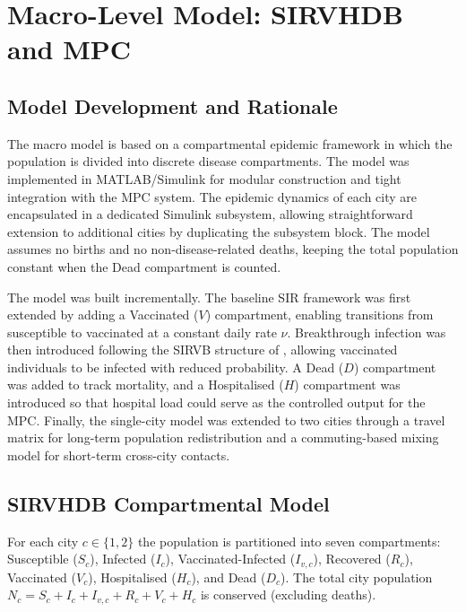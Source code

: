 

\chapter{Macro-Level Model: SIRVHDB and MPC}
\label{ch:macro_model}

\section{Model Development and Rationale}
\label{sec:model_dev}

The macro model is based on a compartmental epidemic framework in which the population is divided into discrete disease compartments.
The model was implemented in MATLAB/Simulink for modular construction and tight integration with the MPC system.
The epidemic dynamics of each city are encapsulated in a dedicated Simulink subsystem, allowing straightforward extension to additional cities by duplicating the subsystem block.
The model assumes no births and no non-disease-related deaths, keeping the total population constant when the Dead compartment is counted.

The model was built incrementally.
The baseline SIR framework was first extended by adding a Vaccinated ($V$) compartment, enabling transitions from susceptible to vaccinated at a constant daily rate $\nu$.
Breakthrough infection was then introduced following the SIRVB structure of \citet{ariyaratne2025}, allowing vaccinated individuals to be infected with reduced probability.
A Dead ($D$) compartment was added to track mortality, and a Hospitalised ($H$) compartment was introduced so that hospital load could serve as the controlled output for the MPC.
Finally, the single-city model was extended to two cities through a travel matrix for long-term population redistribution and a commuting-based mixing model for short-term cross-city contacts.

\section{SIRVHDB Compartmental Model}
\label{sec:sirvhdb}

For each city $c \in \{1, 2\}$ the population is partitioned into seven compartments:
Susceptible ($S_c$), Infected ($I_c$), Vaccinated-Infected ($I_{v,c}$), Recovered ($R_c$), Vaccinated ($V_c$), Hospitalised ($H_c$), and Dead ($D_c$).
The total city population $N_c = S_c + I_c + I_{v,c} + R_c + V_c + H_c$ is conserved (excluding deaths).

